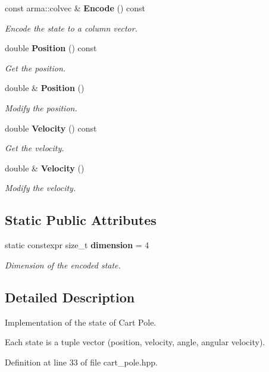\begin{DoxyCompactItemize}
const arma\+::colvec \& \textbf{ Encode} () const
\begin{DoxyCompactList}\small\item\em Encode the state to a column vector. \end{DoxyCompactList}\item 
double \textbf{ Position} () const
\begin{DoxyCompactList}\small\item\em Get the position. \end{DoxyCompactList}\item 
double \& \textbf{ Position} ()
\begin{DoxyCompactList}\small\item\em Modify the position. \end{DoxyCompactList}\item 
double \textbf{ Velocity} () const
\begin{DoxyCompactList}\small\item\em Get the velocity. \end{DoxyCompactList}\item 
double \& \textbf{ Velocity} ()
\begin{DoxyCompactList}\small\item\em Modify the velocity. \end{DoxyCompactList}\end{DoxyCompactItemize}
\subsection*{Static Public Attributes}
\begin{DoxyCompactItemize}
\item 
static constexpr size\+\_\+t \textbf{ dimension} = 4
\begin{DoxyCompactList}\small\item\em Dimension of the encoded state. \end{DoxyCompactList}\end{DoxyCompactItemize}


\subsection{Detailed Description}
Implementation of the state of Cart Pole. 

Each state is a tuple vector (position, velocity, angle, angular velocity). 

Definition at line 33 of file cart\+\_\+pole.\+hpp.



